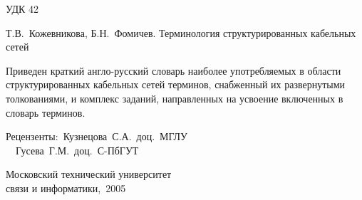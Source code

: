 \begin{flushleft}
    УДК 42\par
    Т.В.~Кожевникова, Б.Н.~Фомичев. Терминология структурированных кабельных сетей
    \par\bigskip
    \noindent Приведен краткий англо-русский словарь наиболее употребляемых в области структурированных
     кабельных сетей терминов, снабженный их развернутыми толкованиями, и комплекс заданий, направленных
     на усвоение включенных в словарь терминов.\par
     \bigskip
     Рецензенты:~Кузнецова~С.А.~доц.~МГЛУ\\
     \hspace{5em}~~Гусева~Г.М.~доц.~С-ПбГУТ\par
     \bigskip
\end{flushleft}
\begin{center}
    Московский технический университет\\
    связи и информатики,~2005
\end{center}